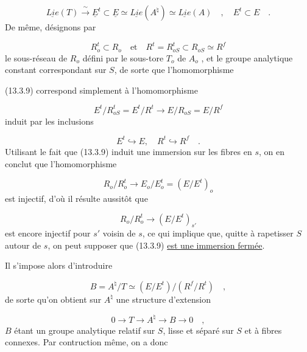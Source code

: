 \begin{equation}\tag{13.3.10}
\underline{Lie}(T) \xrightarrow{\ \sim\ } \underline{E}^{t} \subset \underline{E} \simeq \underline{Lie}(A^{\natural}) \simeq \underline{Lie}(A) \quad , \quad E^{t} \subset E \quad .
\end{equation}
De même, désignons par

\begin{equation}\tag{13.3.11}
R_o^{t} \subset R_o \quad \mathrm{et} \quad R^{t} = R_{oS}^{t} \subset R_{oS} \simeq R^{f}
\end{equation}
le sous-réseau de $R_o$ défini par le sous-tore $T_o$ de $A_o$ , et le groupe analytique constant correspondant sur $S$, de sorte que l'homomorphisme



(13.3.9) correspond simplement à l'homomorphisme

\begin{equation*}
E^{t}/R_{oS}^{t} = E^{t}/R^{t} \longrightarrow E/R_{oS} = E/R^{f}
\end{equation*}
induit par les inclusions

\begin{equation*}
E^{t} \hookrightarrow E, \quad R^{t} \hookrightarrow R^{f} \quad .
\end{equation*}
Utilisant le fait que (13.3.9) induit une immersion sur les fibres en $s$, on en conclut que l'homomorphisme

\begin{equation*}
R_o/R_o^{t} \longrightarrow E_o/E_o^{t} = (E/E^{t})_o
\end{equation*}
est injectif, d'où il résulte aussitôt que

\begin{equation*}
R_o/R_o^{t} \longrightarrow (E/E^{t})_{s'}
\end{equation*}
est encore injectif pour $s'$ voisin de $s$, ce qui implique que, quitte à rapetisser $S$ autour de $s$, on peut supposer que (13.3.9) \underline{est une immersion fermée}.

Il s'impose alors d'introduire

\begin{equation}\tag{13.3.12}
B = A^{\natural}/T \simeq (E/E^{t})/(R^{f}/R^{t}) \quad ,
\end{equation}
de sorte qu'on obtient sur $A^{\natural}$ une structure d'extension

\begin{equation}\tag{13.3.13}
0 \longrightarrow T \longrightarrow A^{\natural} \longrightarrow B \longrightarrow 0 \quad ,
\end{equation}
$B$ étant un groupe analytique relatif sur $S$, lisse et séparé sur $S$ et à fibres connexes. Par contruction même, on a donc


